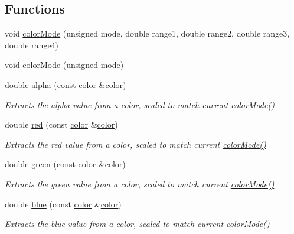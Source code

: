 \subsection*{\-Functions}
\begin{DoxyCompactItemize}
\item 
void \hyperlink{namespacecprocessing_aa2b11af6c6cb096d02a9fb39b6f5a54d}{color\-Mode} (unsigned mode, double range1, double range2, double range3, double range4)
\item 
void \hyperlink{namespacecprocessing_ad508eab02fb5dceff8bda3217f76adb3}{color\-Mode} (unsigned mode)
\item 
double \hyperlink{namespacecprocessing_af2af90b15b409ef85811e5364eeedb8e}{alpha} (const \hyperlink{classcprocessing_1_1color}{color} \&\hyperlink{classcprocessing_1_1color}{color})
\begin{DoxyCompactList}\small\item\em \-Extracts the alpha value from a color, scaled to match current \hyperlink{namespacecprocessing_aa2b11af6c6cb096d02a9fb39b6f5a54d}{color\-Mode()} \end{DoxyCompactList}\item 
double \hyperlink{namespacecprocessing_ac25244d45a769c97ee9df8caf13ca4d2}{red} (const \hyperlink{classcprocessing_1_1color}{color} \&\hyperlink{classcprocessing_1_1color}{color})
\begin{DoxyCompactList}\small\item\em \-Extracts the red value from a color, scaled to match current \hyperlink{namespacecprocessing_aa2b11af6c6cb096d02a9fb39b6f5a54d}{color\-Mode()} \end{DoxyCompactList}\item 
double \hyperlink{namespacecprocessing_ad724cfb2cafe8f17b93ca77b2401ffb6}{green} (const \hyperlink{classcprocessing_1_1color}{color} \&\hyperlink{classcprocessing_1_1color}{color})
\begin{DoxyCompactList}\small\item\em \-Extracts the green value from a color, scaled to match current \hyperlink{namespacecprocessing_aa2b11af6c6cb096d02a9fb39b6f5a54d}{color\-Mode()} \end{DoxyCompactList}\item 
double \hyperlink{namespacecprocessing_a84ba4ac0bae5ee7c4f3f3ded75359dfa}{blue} (const \hyperlink{classcprocessing_1_1color}{color} \&\hyperlink{classcprocessing_1_1color}{color})
\begin{DoxyCompactList}\small\item\em \-Extracts the blue value from a color, scaled to match current \hyperlink{namespacecprocessing_aa2b11af6c6cb096d02a9fb39b6f5a54d}{color\-Mode()} \end{DoxyCompactList}\item 

\end{DoxyCompactItemize}
